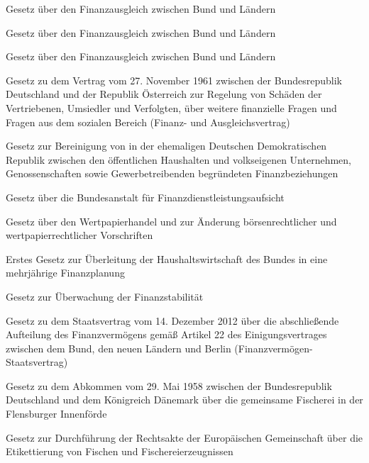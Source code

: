 \item[{FinAusglG-1969}] Gesetz über den Finanzausgleich zwischen Bund und Ländern

\item[{FinAusglG-1993}] Gesetz über den Finanzausgleich zwischen Bund und Ländern

\item[{FinAusglG-2005}] Gesetz über den Finanzausgleich zwischen Bund und Ländern

\item[{FinAusglVtrAUTG}] Gesetz zu dem Vertrag vom 27. November 1961 zwischen der Bundesrepublik Deutschland und der Republik Österreich zur Regelung von Schäden der Vertriebenen, Umsiedler und Verfolgten, über weitere finanzielle Fragen und Fragen aus dem sozialen Bereich (Finanz- und Ausgleichsvertrag)

\item[{FinBerG-DDR}] Gesetz zur Bereinigung von in der ehemaligen Deutschen Demokratischen Republik zwischen den öffentlichen Haushalten und volkseigenen Unternehmen, Genossenschaften sowie Gewerbetreibenden begründeten Finanzbeziehungen

\item[{FinDAG}] Gesetz über die Bundesanstalt für Finanzdienstleistungsaufsicht

\item[{FinMFöG-2}] Gesetz über den Wertpapierhandel und zur Änderung börsenrechtlicher und wertpapierrechtlicher Vorschriften

\item[{FinPlG}] Erstes Gesetz zur Überleitung der Haushaltswirtschaft des Bundes in eine mehrjährige Finanzplanung

\item[{FinStabG}] Gesetz zur Überwachung der Finanzstabilität

\item[{FinVermStVtrG}] Gesetz zu dem Staatsvertrag vom 14. Dezember 2012 über die abschließende Aufteilung des Finanzvermögens gemäß Artikel 22 des Einigungsvertrages zwischen dem Bund, den neuen Ländern und Berlin (Finanzvermögen-Staatsvertrag)

\item[{FischDNKVtrG}] Gesetz zu dem Abkommen vom 29. Mai 1958 zwischen der Bundesrepublik Deutschland und dem Königreich Dänemark über die gemeinsame Fischerei in der Flensburger Innenförde

\item[{FischEtikettG}] Gesetz zur Durchführung der Rechtsakte der Europäischen Gemeinschaft über die Etikettierung von Fischen und Fischereierzeugnissen

